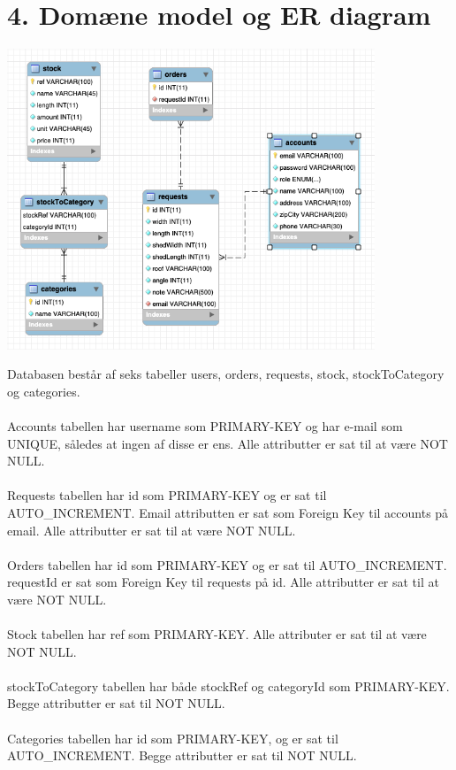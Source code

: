 \documentclass[11pt]{report}
\begin{document}
\chapter*{4. Domæne model og ER diagram}
\begin{center}
\includegraphics[width=11cm]{Er.png}
\end{center}
Databasen består af seks tabeller users, orders, requests, stock,
stockToCategory og categories. 
\\
\\
Accounts tabellen har username som
PRIMARY-KEY og har e-mail som UNIQUE, således at ingen af disse er
ens. Alle attributter er sat til at være NOT NULL. 
\\
\\
Requests tabellen har id som PRIMARY-KEY og er sat til
AUTO\_INCREMENT. Email attributten
er sat som Foreign Key til accounts på email. Alle attributter er sat
til at være NOT NULL. 
\\
\\
Orders tabellen har id som PRIMARY-KEY og er sat
til AUTO\_INCREMENT. requestId er sat som Foreign Key til requests på
id. Alle attributter er sat til at være NOT NULL. 
\\
\\
Stock tabellen har
ref som PRIMARY-KEY. Alle attributer er sat til at være NOT
NULL. 
\\
\\
stockToCategory tabellen har både stockRef og categoryId som
PRIMARY-KEY. Begge attributter er sat til NOT NULL. 
\\
\\
Categories tabellen har id som PRIMARY-KEY, og er sat til AUTO\_INCREMENT. Begge attributter er sat til NOT NULL.
\newpage
\end{document}
